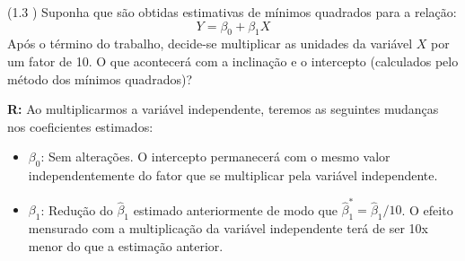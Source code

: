 \documentclass[12pt,letterpaper, onecolumn]{exam}
\renewenvironment{solution}
  {\par\noindent\textbf{R:}\enspace\color{blue}}
  {\par\color{black}}
\begin{document}
\begin{questions}
    \question (1.3 \citep{pindyck_rubinfeld1998}) Suponha que são obtidas estimativas de mínimos quadrados para a relação:\begin{equation*}
        Y = \beta_0 + \beta_1X
    \end{equation*}
      Após o término do trabalho, decide-se multiplicar as unidades da variável $X$ por um fator de 10. O que acontecerá com a inclinação e o intercepto (calculados pelo método dos mínimos quadrados)?
      \begin{solution}
          Ao multiplicarmos a variável independente, teremos as seguintes mudanças nos coeficientes estimados:
          \begin{itemize}
              \item $\beta_0$: Sem alterações. O intercepto permanecerá com o mesmo valor independentemente do fator que se multiplicar pela variável independente.
              \item $\beta_1$: Redução do $\hat \beta_1$ estimado anteriormente de modo que $\hat \beta_1^* = \hat\beta_1/10$. O efeito mensurado com a multiplicação da variável independente terá de ser 10x menor do que a estimação anterior.
          \end{itemize}
      \end{solution}
    
\end{questions}

\end{document}
